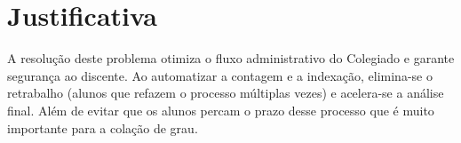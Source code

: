 \chapter{Justificativa}
\label{justificativa}
A resolução deste problema otimiza o fluxo administrativo do Colegiado e garante segurança ao discente. Ao automatizar a contagem e a indexação, elimina-se o retrabalho (alunos que refazem o processo múltiplas vezes) e acelera-se a análise final. Além de evitar que os alunos percam o prazo desse processo que é muito importante para a colação de grau.





